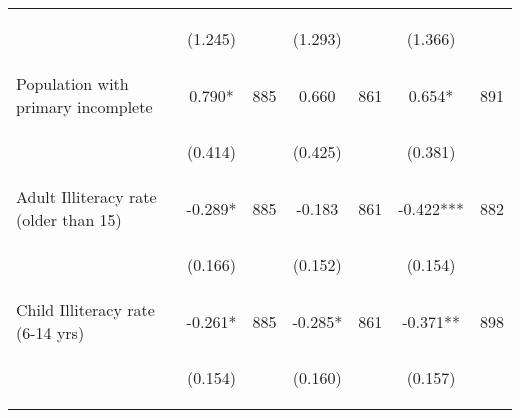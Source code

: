 \begin{tabular}{lcccccc}
\vspace{4pt} &  \begin{footnotesize}(1.245)\end{footnotesize}   & &
			    \begin{footnotesize}(1.293)\end{footnotesize}   & &
			    \begin{footnotesize}(1.366)\end{footnotesize}   &
			     \\          

Population with primary incomplete   &  0.790*   &  885  &   0.660  &  861 &  0.654*  &  891   \\

\vspace{4pt} &  \begin{footnotesize}(0.414)\end{footnotesize}   & &
			    \begin{footnotesize}(0.425)\end{footnotesize}   & &
			    \begin{footnotesize}(0.381)\end{footnotesize}   &
			     \\          

Adult Illiteracy rate (older than 15)   &  -0.289*   &  885  &   -0.183  &  861 &  -0.422***  &  882   \\

\vspace{4pt} &  \begin{footnotesize}(0.166)\end{footnotesize}   & &
			    \begin{footnotesize}(0.152)\end{footnotesize}   & &
			    \begin{footnotesize}(0.154)\end{footnotesize}   &
			     \\          

Child Illiteracy rate (6-14 yrs)   &  -0.261*   &  885  &   -0.285*  &  861 &  -0.371**  &  898   \\

\vspace{4pt} &  \begin{footnotesize}(0.154)\end{footnotesize}   & &
			    \begin{footnotesize}(0.160)\end{footnotesize}   & &
			    \begin{footnotesize}(0.157)\end{footnotesize}   &
			     \\          


\end{tabular}
